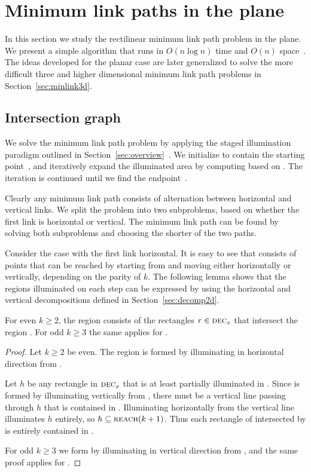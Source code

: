 \documentclass[english,gradu]{tktltiki2018}
\begin{document}
\section{Minimum link paths in the plane}\label{sec:minlink2d}

In this section we study the rectilinear minimum link path problem in the plane.
We present a simple algorithm that runs in $O(n\log n)$ time and $O(n)$ space~\cite{revisited}.
The ideas developed for the planar case are later generalized to solve the more difficult three and higher dimensional minimum link path problems in Section~\ref{sec:minlink3d}.

\subsection{Intersection graph}

We solve the minimum link path problem by applying the staged illumination paradigm outlined in Section~\ref{sec:overview}~\cite{revisited}.
We initialize  to contain the starting point~\spt, and iteratively expand the illuminated area by computing  based on .
The iteration is continued until we find the endpoint~\ept.

Clearly any minimum link path consists of alternation between horizontal and vertical links.
We split the problem into two subproblems, based on whether the first link is horizontal or vertical.
The minimum link path can be found by solving both subproblems and choosing the shorter of the two paths.

Consider the case with the first link horizontal.
It is easy to see that  consists of points that can be reached by starting from  and moving either horizontally or vertically, depending on the parity of $k$.
The following lemma shows that the regions illuminated on each step can be expressed by using the horizontal and vertical decompositions defined in Section~\ref{sec:decomp2d}.

\begin{lem}\label{lem:illum2d}
For even $k\ge 2$, the region  consists of the rectangles $r\in\textsc{dec}_{x}$ that intersect the region .
For odd $k\ge 3$ the same applies for .
\end{lem}
\begin{proof}
Let $k\ge 2$ be even.
The region  is formed by illuminating in horizontal direction from .

Let $h$ be any rectangle in $\textsc{dec}_{x}$ that is at least partially illuminated in .
Since  is formed by illuminating vertically from , there must be a vertical line passing through $h$ that is contained in .
Illuminating horizontally from the vertical line illuminates $h$ entirely, so $h\subseteq\textsc{reach}(k+1)$.
Thus each rectangle of  intersected by  is entirely contained in .

For odd $k\ge 3$ we form  by illuminating in vertical direction from , and the same proof applies for .
\end{proof}
\end{document}
